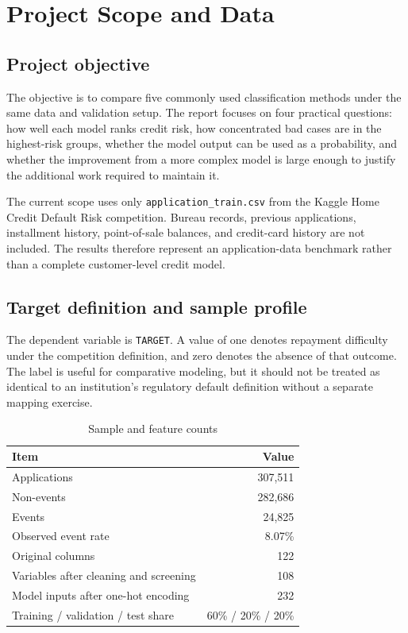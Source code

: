 \documentclass[11pt]{article}
\begin{document}
\section{Project Scope and Data}

\subsection{Project objective}
The objective is to compare five commonly used classification methods under the same data and validation setup. The report focuses on four practical questions: how well each model ranks credit risk, how concentrated bad cases are in the highest-risk groups, whether the model output can be used as a probability, and whether the improvement from a more complex model is large enough to justify the additional work required to maintain it.

The current scope uses only \texttt{application\_train.csv} from the Kaggle Home Credit Default Risk competition. Bureau records, previous applications, installment history, point-of-sale balances, and credit-card history are not included. The results therefore represent an application-data benchmark rather than a complete customer-level credit model.

\subsection{Target definition and sample profile}
The dependent variable is \texttt{TARGET}. A value of one denotes repayment difficulty under the competition definition, and zero denotes the absence of that outcome. The label is useful for comparative modeling, but it should not be treated as identical to an institution's regulatory default definition without a separate mapping exercise.

\begin{table}[H]
\centering
\caption{Sample and feature counts}
\small
\begin{tabular}{L{7.0cm}r}
\toprule
Item & Value \\
\midrule
Applications & 307,511 \\
Non-events & 282,686 \\
Events & 24,825 \\
Observed event rate & 8.07\% \\
Original columns & 122 \\
Variables after cleaning and screening & 108 \\
Model inputs after one-hot encoding & 232 \\
Training / validation / test share & 60\% / 20\% / 20\% \\
\bottomrule
\end{tabular}
\end{table}
\end{document}
